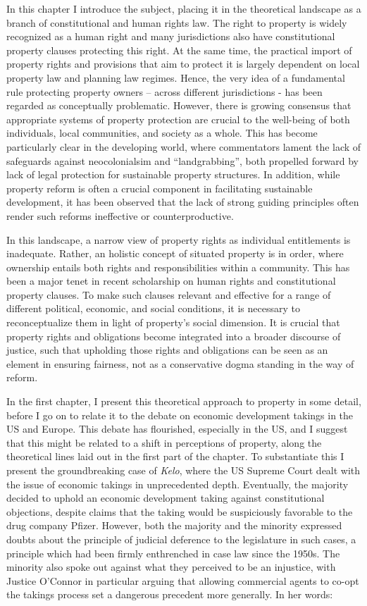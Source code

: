 \documentclass[12pt,a4paper]{article} %
\begin{document}
In this chapter I introduce the subject, placing it in the theoretical landscape as a branch of constitutional and human rights law. The right to property is widely recognized as a human right and many jurisdictions also have constitutional property clauses protecting this right. At the same time, the practical import of property rights and provisions that aim to protect it is largely dependent on local property law and planning law regimes. Hence, the very idea of a fundamental rule protecting property owners -- across different jurisdictions - has been regarded as conceptually problematic. However, there is growing consensus that appropriate systems of property protection are crucial to the well-being of both individuals, local communities, and society as a whole. This has become particularly clear in the developing world, where commentators lament the lack of safeguards against neocolonialsim and ``landgrabbing'', both propelled forward by lack of legal protection for sustainable property structures. In addition, while property reform is often a crucial component in facilitating sustainable development, it has been observed that the lack of strong guiding principles often render such reforms ineffective or counterproductive. 

In this landscape, a narrow view of property rights as individual entitlements is inadequate. Rather, an holistic concept of situated property is in order, where ownership entails both rights and responsibilities within a community. This has been a major tenet in recent scholarship on human rights and constitutional property clauses. To make such clauses relevant and effective for a range of different political, economic, and social conditions, it is necessary to reconceptualize them in light of property's social dimension. It is crucial that property rights and obligations become integrated into a broader discourse of justice, such that upholding those rights and obligations can be seen as an element in ensuring fairness, not as a conservative dogma standing in the way of reform.

In the first chapter, I present this theoretical approach to property in some detail, before I go on to relate it to the debate on economic development takings in the US and Europe. This debate has flourished, especially in the US, and I suggest that this might be related to a shift in perceptions of property, along the theoretical lines laid out in the first part of the chapter. To substantiate this I present the groundbreaking case of {\it Kelo}, where the US Supreme Court dealt with the issue of economic takings in unprecedented depth. Eventually, the majority decided to uphold an economic development taking against constitutional objections, despite claims that the taking would be suspiciously favorable to the drug company Pfizer. However, both the majority and the minority expressed doubts about the principle of judicial deference to the legislature in such cases, a principle which had been firmly enthrenched in case law since the 1950s. The minority also spoke out against what they perceived to be an injustice, with Justice O'Connor in particular arguing that allowing commercial agents to co-opt the takings process set a dangerous precedent more generally. In her words: 
\end{document}
